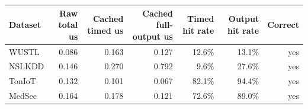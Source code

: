 \begin{tabular}{lrrrrrr}
\toprule
Dataset & Raw total us & Cached timed us & Cached full-output us & Timed hit rate & Output hit rate & Correct \\
\midrule
WUSTL & 0.086 & 0.163 & 0.127 & 12.6\% & 13.1\% & yes \\
NSLKDD & 0.146 & 0.270 & 0.792 & 9.6\% & 27.6\% & yes \\
TonIoT & 0.132 & 0.101 & 0.067 & 82.1\% & 94.4\% & yes \\
MedSec & 0.164 & 0.178 & 0.121 & 72.6\% & 89.0\% & yes \\
\bottomrule
\end{tabular}

